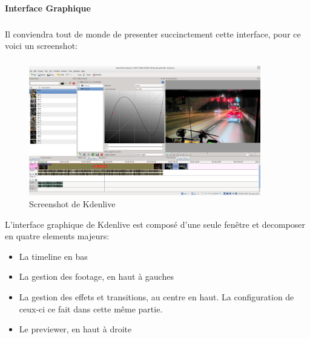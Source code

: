 \paragraph {Interface Graphique}

\subparagraph{}

Il conviendra tout de monde de presenter succinctement cette interface,
pour ce voici un screenshot:

\subparagraph{}

\begin{figure}[H]

  \begin{center}

    \includegraphics[width=0.90\textwidth]{images/kdenlive}

  \end{center}

  \caption{Screenshot de Kdenlive}

  \label{Yes}

\end{figure}

L'interface graphique de Kdenlive est composé d'une seule fenêtre et
decomposer en quatre elements majeurs:

\begin{itemize}

  \item {La timeline en bas}

  \item {La gestion des footage, en haut à gauches}

  \item {La gestion des effets et transitions, au centre en haut. La
  configuration de ceux-ci ce fait dans cette même partie.}

  \item {Le previewer, en haut à droite}

\end{itemize}

